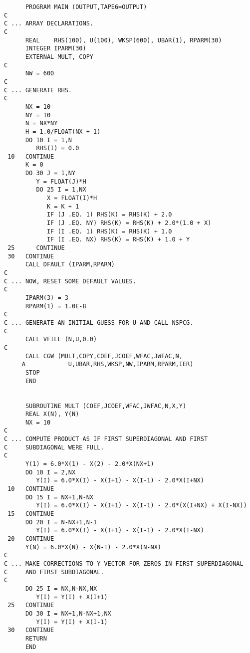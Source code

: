 \begin{verbatim}
      PROGRAM MAIN (OUTPUT,TAPE6=OUTPUT)
C
C ... ARRAY DECLARATIONS.
C
      REAL    RHS(100), U(100), WKSP(600), UBAR(1), RPARM(30)
      INTEGER IPARM(30)
      EXTERNAL MULT, COPY 
C
      NW = 600
C
C ... GENERATE RHS. 
C
      NX = 10
      NY = 10
      N = NX*NY
      H = 1.0/FLOAT(NX + 1)
      DO 10 I = 1,N 
         RHS(I) = 0.0
 10   CONTINUE
      K = 0
      DO 30 J = 1,NY
         Y = FLOAT(J)*H
         DO 25 I = 1,NX
            X = FLOAT(I)*H
            K = K + 1
            IF (J .EQ. 1) RHS(K) = RHS(K) + 2.0
            IF (J .EQ. NY) RHS(K) = RHS(K) + 2.0*(1.0 + X)
            IF (I .EQ. 1) RHS(K) = RHS(K) + 1.0
            IF (I .EQ. NX) RHS(K) = RHS(K) + 1.0 + Y
 25      CONTINUE
 30   CONTINUE
      CALL DFAULT (IPARM,RPARM)
C
C ... NOW, RESET SOME DEFAULT VALUES.
C
      IPARM(3) = 3
      RPARM(1) = 1.0E-8
C
C ... GENERATE AN INITIAL GUESS FOR U AND CALL NSPCG.
C
      CALL VFILL (N,U,0.0)
C
      CALL CGW (MULT,COPY,COEF,JCOEF,WFAC,JWFAC,N,
     A            U,UBAR,RHS,WKSP,NW,IPARM,RPARM,IER)
      STOP
      END 


      SUBROUTINE MULT (COEF,JCOEF,WFAC,JWFAC,N,X,Y)
      REAL X(N), Y(N)
      NX = 10
C
C ... COMPUTE PRODUCT AS IF FIRST SUPERDIAGONAL AND FIRST
C     SUBDIAGONAL WERE FULL.
C
      Y(1) = 6.0*X(1) - X(2) - 2.0*X(NX+1)
      DO 10 I = 2,NX
         Y(I) = 6.0*X(I) - X(I+1) - X(I-1) - 2.0*X(I+NX) 
 10   CONTINUE
      DO 15 I = NX+1,N-NX
         Y(I) = 6.0*X(I) - X(I+1) - X(I-1) - 2.0*(X(I+NX) + X(I-NX))
 15   CONTINUE
      DO 20 I = N-NX+1,N-1
         Y(I) = 6.0*X(I) - X(I+1) - X(I-1) - 2.0*X(I-NX)
 20   CONTINUE
      Y(N) = 6.0*X(N) - X(N-1) - 2.0*X(N-NX)
C
C ... MAKE CORRECTIONS TO Y VECTOR FOR ZEROS IN FIRST SUPERDIAGONAL
C     AND FIRST SUBDIAGONAL.
C
      DO 25 I = NX,N-NX,NX
         Y(I) = Y(I) + X(I+1)
 25   CONTINUE
      DO 30 I = NX+1,N-NX+1,NX
         Y(I) = Y(I) + X(I-1)
 30   CONTINUE
      RETURN
      END 
\end{verbatim}
\newpage
